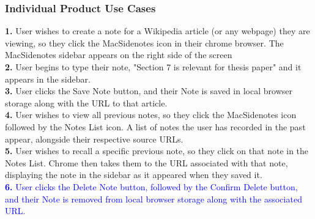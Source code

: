 \documentclass[12pt, titlepage]{article}
\begin{document}
\subsubsection{Individual Product Use Cases}
{\bf 1.} User wishes to create a note for a Wikipedia article (or any webpage) 
they are viewing, so they click the MacSidenotes icon in their chrome browser. 
The MacSidenotes sidebar appears on the right side of the screen\\
{\bf 2.} User begins to type their note, "Section 7 is relevant for thesis 
paper" and it appears in the sidebar.\\
{\bf 3.} User clicks the Save Note button, and their Note is saved in local 
browser storage along with the URL to that article.\\
{\bf 4.} User wishes to view all previous notes, so they click the MacSidenotes 
icon followed by the Notes List icon. A list of notes the user has recorded in 
the past appear, alongside their respective source URLs.\\
{\bf 5.} User wishes to recall a specific previous note, so they click on that 
note in the Notes List. Chrome then takes them to the URL associated with that 
note, displaying the note in the sidebar as it appeared when they saved it.\\
\textcolor{blue}{{\bf 6.} User clicks the Delete Note button, followed by the 
Confirm Delete button, and their Note is removed from local browser storage 
along with the associated URL.}
\end{document}
